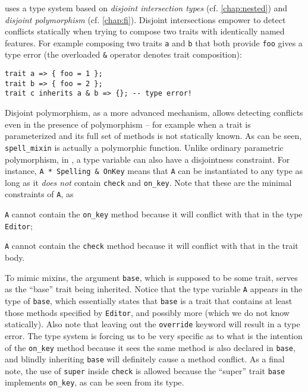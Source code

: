 \sedel uses a type system based on \emph{disjoint intersection types} (cf. \cref{chap:nested}) and
\emph{disjoint polymorphism} (cf. \cref{chap:fi}). Disjoint intersections
empower \sedel to detect conflicts statically when trying to compose two
traits with identically named features. For example composing two traits
\lstinline{a} and \lstinline{b} that both provide \lstinline{foo} gives a
type error (the overloaded \lstinline{&} operator denotes trait composition):
\begin{lstlisting}
trait a => { foo = 1 };
trait b => { foo = 2 };
trait c inherits a & b => {}; -- type error!
\end{lstlisting}
Disjoint polymorphism, as a more advanced mechanism, allows detecting conflicts
even in the presence of polymorphism -- for example when a trait is parameterized and its
full set of methods is not statically known. As can be seen,
\lstinline{spell_mixin} is actually a polymorphic function. Unlike ordinary
parametric polymorphism, in \sedel, a type variable can also have a disjointness
constraint. For instance, \lstinline{A * Spelling & OnKey}
means that \lstinline{A} can be instantiated to any type as long as it \emph{does not}
contain \lstinline{check} and \lstinline{on_key}. Note that these are the minimal constraints of \lstinline{A},
as
\begin{inparaenum}[(1)]
  \item \lstinline{A} cannot contain the \lstinline{on_key} method because it will conflict with that in the type \lstinline{Editor};
  \item \lstinline{A} cannot contain the \lstinline{check} method because it will conflict with that in the trait body.
\end{inparaenum}
To mimic mixins, the
argument \lstinline{base}, which is supposed to be some trait, serves as the
``base'' trait being inherited. Notice that the type variable
\lstinline{A} appears in the type of \lstinline{base}, which essentially states
that \lstinline{base} is a trait that contains at least those methods specified
by \lstinline{Editor}, and possibly more (which we do not know statically).
Also note that leaving out the \lstinline{override} keyword will result in a
type error. The type system is forcing us to be very specific as to what is the
intention of the \lstinline{on_key} method because it sees the same method is
also declared in \lstinline{base}, and blindly inheriting \lstinline{base}
will definitely cause a method conflict. As a final note, the use of \lstinline{super}
inside \lstinline{check} is allowed because the ``super'' trait \lstinline{base}
implements \lstinline{on_key}, as can be seen from its type.



